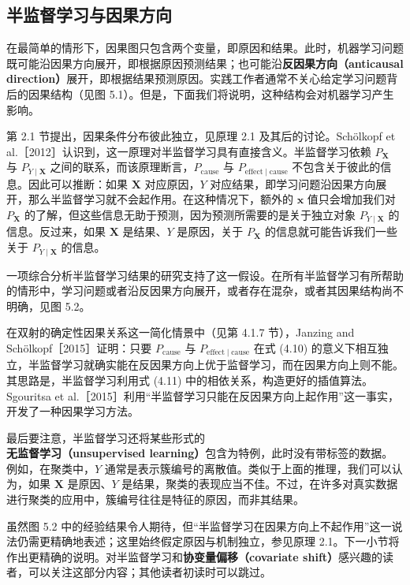 \subsection{半监督学习与因果方向}
\label{sec:ch05-ssl-causal-direction}

在最简单的情形下，因果图只包含两个变量，即原因和结果。此时，机器学习问题既可能沿因果方向展开，即根据原因预测结果；也可能沿\textbf{反因果方向（anticausal direction）}展开，即根据结果预测原因。实践工作者通常不关心给定学习问题背后的因果结构（见图 5.1）。但是，下面我们将说明，这种结构会对机器学习产生影响。

第 2.1 节提出，因果条件分布彼此独立，见原理 2.1 及其后的讨论。Schölkopf et al.［2012］认识到，这一原理对半监督学习具有直接含义。半监督学习依赖 $P_{\mathbf{X}}$ 与 $P_{Y\mid\mathbf{X}}$ 之间的联系，而该原理断言，$P_{\mathrm{cause}}$ 与 $P_{\mathrm{effect}\mid\mathrm{cause}}$ 不包含关于彼此的信息。因此可以推断：如果 $\mathbf{X}$ 对应原因，$Y$ 对应结果，即学习问题沿因果方向展开，那么半监督学习就不会起作用。在这种情况下，额外的 $\mathbf{x}$ 值只会增加我们对 $P_{\mathbf{X}}$ 的了解，但这些信息无助于预测，因为预测所需要的是关于独立对象 $P_{Y\mid\mathbf{X}}$ 的信息。反过来，如果 $\mathbf{X}$ 是结果、$Y$ 是原因，关于 $P_{\mathbf{X}}$ 的信息就可能告诉我们一些关于 $P_{Y\mid\mathbf{X}}$ 的信息。

一项综合分析半监督学习结果的研究支持了这一假设。在所有半监督学习有所帮助的情形中，学习问题或者沿反因果方向展开，或者存在混杂，或者其因果结构尚不明确，见图 5.2。



在双射的确定性因果关系这一简化情景中（见第 4.1.7 节），Janzing and Schölkopf［2015］证明：只要 $P_{\mathrm{cause}}$ 与 $P_{\mathrm{effect}\mid\mathrm{cause}}$ 在式 (4.10) 的意义下相互独立，半监督学习就确实能在反因果方向上优于监督学习，而在因果方向上则不能。其思路是，半监督学习利用式 (4.11) 中的相依关系，构造更好的插值算法。Sgouritsa et al.［2015］利用“半监督学习只能在反因果方向上起作用”这一事实，开发了一种因果学习方法。

最后要注意，半监督学习还将某些形式的\textbf{无监督学习（unsupervised learning）}包含为特例，此时没有带标签的数据。例如，在聚类中，$Y$ 通常是表示簇编号的离散值。类似于上面的推理，我们可以认为，如果 $\mathbf{X}$ 是原因、$Y$ 是结果，聚类的表现应当不佳。不过，在许多对真实数据进行聚类的应用中，簇编号往往是特征的原因，而非其结果。



虽然图 5.2 中的经验结果令人期待，但“半监督学习在因果方向上不起作用”这一说法仍需更精确地表述；这里始终假定原因与机制独立，参见原理 2.1。下一小节将作出更精确的说明。对半监督学习和\textbf{协变量偏移（covariate shift）}感兴趣的读者，可以关注这部分内容；其他读者初读时可以跳过。
\FloatBarrier
